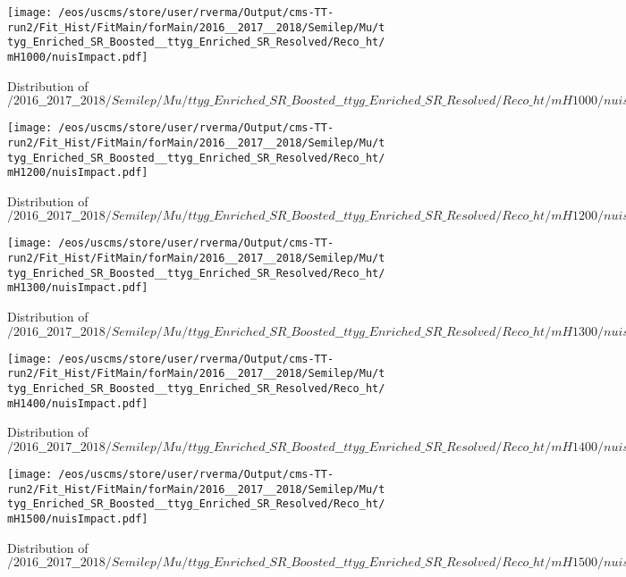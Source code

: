 \begin{figure}
\centering
\texttt{[image: /eos/uscms/store/user/rverma/Output/cms-TT-run2/Fit\_Hist/FitMain/forMain/2016\_\_2017\_\_2018/Semilep/Mu/ttyg\_Enriched\_SR\_Boosted\_\_ttyg\_Enriched\_SR\_Resolved/Reco\_ht/mH1000/nuisImpact.pdf]}
\caption{Distribution of $/2016\_\_2017\_\_2018/Semilep/Mu/ttyg\_Enriched\_SR\_Boosted\_\_ttyg\_Enriched\_SR\_Resolved/Reco\_ht/mH1000/nuisImpact.pdf$}
\end{figure}

\begin{figure}
\centering
\texttt{[image: /eos/uscms/store/user/rverma/Output/cms-TT-run2/Fit\_Hist/FitMain/forMain/2016\_\_2017\_\_2018/Semilep/Mu/ttyg\_Enriched\_SR\_Boosted\_\_ttyg\_Enriched\_SR\_Resolved/Reco\_ht/mH1200/nuisImpact.pdf]}
\caption{Distribution of $/2016\_\_2017\_\_2018/Semilep/Mu/ttyg\_Enriched\_SR\_Boosted\_\_ttyg\_Enriched\_SR\_Resolved/Reco\_ht/mH1200/nuisImpact.pdf$}
\end{figure}

\begin{figure}
\centering
\texttt{[image: /eos/uscms/store/user/rverma/Output/cms-TT-run2/Fit\_Hist/FitMain/forMain/2016\_\_2017\_\_2018/Semilep/Mu/ttyg\_Enriched\_SR\_Boosted\_\_ttyg\_Enriched\_SR\_Resolved/Reco\_ht/mH1300/nuisImpact.pdf]}
\caption{Distribution of $/2016\_\_2017\_\_2018/Semilep/Mu/ttyg\_Enriched\_SR\_Boosted\_\_ttyg\_Enriched\_SR\_Resolved/Reco\_ht/mH1300/nuisImpact.pdf$}
\end{figure}

\begin{figure}
\centering
\texttt{[image: /eos/uscms/store/user/rverma/Output/cms-TT-run2/Fit\_Hist/FitMain/forMain/2016\_\_2017\_\_2018/Semilep/Mu/ttyg\_Enriched\_SR\_Boosted\_\_ttyg\_Enriched\_SR\_Resolved/Reco\_ht/mH1400/nuisImpact.pdf]}
\caption{Distribution of $/2016\_\_2017\_\_2018/Semilep/Mu/ttyg\_Enriched\_SR\_Boosted\_\_ttyg\_Enriched\_SR\_Resolved/Reco\_ht/mH1400/nuisImpact.pdf$}
\end{figure}

\begin{figure}
\centering
\texttt{[image: /eos/uscms/store/user/rverma/Output/cms-TT-run2/Fit\_Hist/FitMain/forMain/2016\_\_2017\_\_2018/Semilep/Mu/ttyg\_Enriched\_SR\_Boosted\_\_ttyg\_Enriched\_SR\_Resolved/Reco\_ht/mH1500/nuisImpact.pdf]}
\caption{Distribution of $/2016\_\_2017\_\_2018/Semilep/Mu/ttyg\_Enriched\_SR\_Boosted\_\_ttyg\_Enriched\_SR\_Resolved/Reco\_ht/mH1500/nuisImpact.pdf$}
\end{figure}

